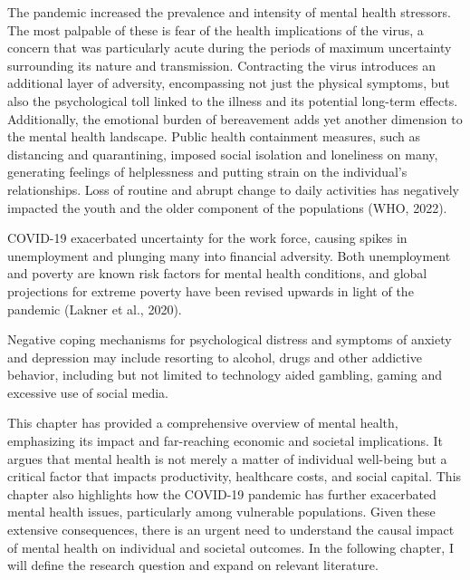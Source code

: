     The pandemic increased the prevalence and intensity of mental health stressors. The most palpable of these is fear of the health implications of the virus, a concern that was particularly acute during the periods of maximum uncertainty surrounding its nature and transmission. Contracting the virus introduces an additional layer of adversity, encompassing not just the physical symptoms, but also the psychological toll linked to the illness and its potential long-term effects. Additionally, the emotional burden of bereavement adds yet another dimension to the mental health landscape.
    Public health containment measures, such as distancing and quarantining, imposed social isolation and loneliness on many, generating feelings of helplessness and putting strain on the individual's relationships. Loss of routine and abrupt change to daily activities has negatively impacted the youth and the older component of the populations (WHO, 2022). 

    COVID-19 exacerbated uncertainty for the work force, causing spikes in unemployment and plunging many into financial adversity. Both unemployment and poverty are known risk factors for mental health conditions, and global projections for extreme poverty have been revised upwards in light of the pandemic (Lakner et al., 2020). 

    Negative coping mechanisms for psychological distress and symptoms of anxiety and depression may include resorting to alcohol, drugs and other addictive behavior, including but not limited to technology aided gambling, gaming and excessive use of social media. 


\vspace{0.5 cm}
This chapter has provided a comprehensive overview of mental health, emphasizing its impact and far-reaching economic and societal implications. It argues that mental health is not merely a matter of individual well-being but a critical factor that impacts productivity, healthcare costs, and social capital. This chapter also highlights how the COVID-19 pandemic has further exacerbated mental health issues, particularly among vulnerable populations. Given these extensive consequences, there is an urgent need to understand the causal impact of mental health on individual and societal outcomes. In the following chapter, I will define the research question and expand on relevant literature. 

